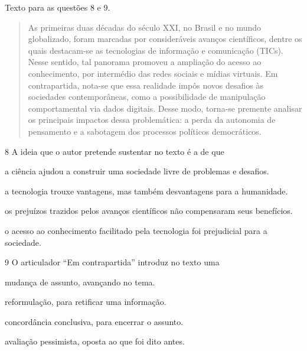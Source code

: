 Texto para as questões 8 e 9.

\begin{quote}
As primeiras duas décadas do século XXI, no Brasil e no mundo
globalizado, foram marcadas por consideráveis avanços científicos,
dentre os quais destacam-se as tecnologias de informação e comunicação
(TICs). Nesse sentido, tal panorama promoveu a ampliação do acesso ao
conhecimento, por intermédio das redes sociais e mídias virtuais. Em
contrapartida, nota-se que essa realidade impôs novos desafios às
sociedades contemporâneas, como a possibilidade de manipulação
comportamental via dados digitais. Desse modo, torna-se premente
analisar os principais impactos dessa problemática: a perda da autonomia
de pensamento e a sabotagem dos processos políticos democráticos.

\end{quote}

\num{8} A ideia que o autor pretende sustentar no texto é a de que

\begin{escolha}
\item a ciência ajudou a construir uma sociedade livre de problemas e
desafios.

\item a tecnologia trouxe vantagens, mas também desvantagens para a
humanidade.

\item os prejuízos trazidos pelos avanços científicos não compensaram seus
benefícios.

\item o acesso ao conhecimento facilitado pela tecnologia foi prejudicial
para a sociedade.
\end{escolha}

\num{9} 
O articulador ``Em contrapartida'' introduz no texto uma

\begin{escolha}
\item mudança de assunto, avançando no tema.

\item reformulação, para retificar uma informação.

\item concordância conclusiva, para encerrar o assunto.

\item avaliação pessimista, oposta ao que foi dito antes.
\end{escolha}

